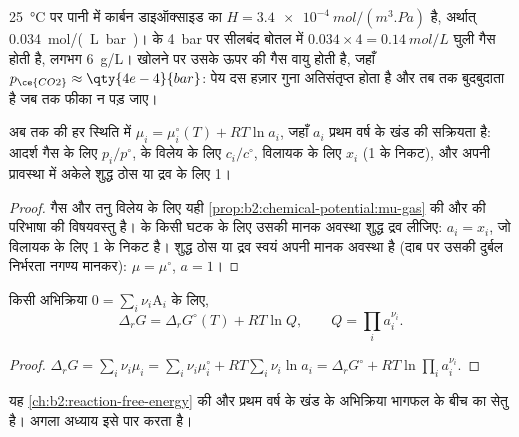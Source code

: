 \begin{example}[सोडा में कार्बन डाइऑक्साइड]\label{ex:b2:chemical-potential:soda}
\qty{25}{\celsius} पर पानी में कार्बन डाइऑक्साइड का  $H =
\qty{3.4e-4}{mol/(m^3.Pa)}$ है, अर्थात् \qty{0.034}{mol/(L.bar)}।  के
\qty{4}{bar} पर सीलबंद बोतल में $0.034 \times 4 =
\qty{0.14}{mol/L}$ घुली गैस होती है, लगभग \qty{6}{g/L}। खोलने पर उसके
ऊपर की गैस वायु होती है, जहाँ $p_{\ce{CO2}} \approx \qty{4e-4}{bar}$: पेय
दस हज़ार गुना अतिसंतृप्त होता है और तब तक बुदबुदाता है जब तक फीका न पड़ जाए।
\end{example}

\begin{proposition}[रासायनिक विभवों से सक्रियताएँ]\label{prop:b2:chemical-potential:activity}
अब तक की हर स्थिति में $\mu_i = \mu_i^\circ(T) + RT\ln a_i$, जहाँ $a_i$
प्रथम वर्ष के खंड की सक्रियता है: आदर्श गैस के लिए $p_i/p^\circ$,
 के विलेय के लिए $c_i/c^\circ$, विलायक के लिए $x_i$ (1 के निकट),
और अपनी प्रावस्था में अकेले शुद्ध ठोस या द्रव के लिए 1।
\end{proposition}

\begin{proof}
गैस और तनु विलेय के लिए यही
\cref{prop:b2:chemical-potential:mu-gas} की और  की परिभाषा की विषयवस्तु है।  के किसी घटक के लिए उसकी मानक
अवस्था शुद्ध द्रव लीजिए: $a_i = x_i$, जो विलायक के लिए 1 के निकट है। शुद्ध ठोस
या द्रव स्वयं अपनी मानक अवस्था है (दाब पर उसकी दुर्बल निर्भरता
नगण्य मानकर): $\mu = \mu^\circ$, $a = 1$।
\end{proof}

\begin{proposition}[अभिक्रिया गिब्स ऊर्जा और भागफल]\label{prop:b2:chemical-potential:delta-g-q}
किसी अभिक्रिया $0 = \sum_i\nu_i\mathrm A_i$ के लिए,
\[
  \Delta_r G = \Delta_r G^\circ(T) + RT\ln Q, \qquad Q = \prod_i a_i^{\nu_i} .
\]
\end{proposition}

\begin{proof}
$\Delta_r G = \sum_i\nu_i\mu_i = \sum_i\nu_i\mu_i^\circ + RT\sum_i\nu_i\ln a_i =
\Delta_r G^\circ + RT\ln\prod_i a_i^{\nu_i}$.
\end{proof}

यह \cref{ch:b2:reaction-free-energy} की  और प्रथम वर्ष के खंड
के अभिक्रिया भागफल के बीच का सेतु है। अगला अध्याय इसे पार करता है।

